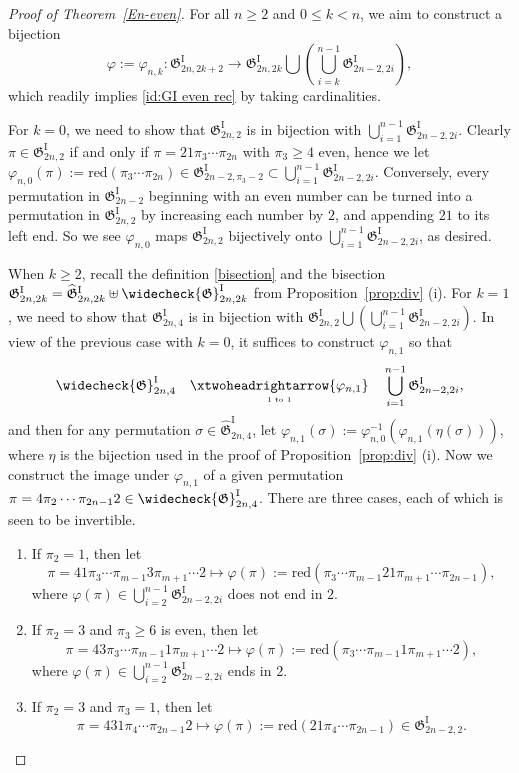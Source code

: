 \documentclass[11pt,reqno]{amsart}
\numberwithin{equation}{section}
\theoremstyle{plain}
\theoremstyle{definition}
\newcommand{\fG}{\mathfrak{G}}
\newcommand{\GI}{\fG^{\mathrm{I}}}
\newcommand{\tGI}{\widehat{\fG}^{\mathrm{I}}}
\newcommand{\cGI}{\widecheck{\fG}^{\mathrm{I}}}
\def\re{\mathrm{red}}
\begin{document}
\begin{proof}[Proof of Theorem~\ref{En-even}]
	For all $n\ge 2$ and $0\le k < n$, we aim to construct a bijection  $$\varphi:=\varphi_{n,k}: \GI_{2n,2k+2} \to \GI_{2n,2k}\bigcup\left(\bigcup_{i=k}^{n-1}\GI_{2n-2,2i}\right),$$ 
	which readily implies \eqref{id:GI even rec} by taking cardinalities.
	
	For $k=0$, we need to show that $\GI_{2n,2}$ is in bijection with $\bigcup_{i=1}^{n-1}\GI_{2n-2,2i}$. Clearly $\pi \in \GI_{2n,2}$ if and only if $\pi =21 \pi_3 \cdots \pi_{2n}$ with $\pi_3\ge 4$ even, hence we let $\varphi_{n,0}(\pi):=\re(\pi_3\cdots \pi_{2n})\in\GI_{2n-2,\pi_3-2}\subset\bigcup_{i=1}^{n-1}\GI_{2n-2,2i}$. Conversely, every permutation in $\GI_{2n-2}$ beginning with an even number can be turned into a permutation in $\GI_{2n,2}$ by increasing each number by $2$, and appending $21$ to its left end. So we see $\varphi_{n,0}$ maps $\GI_{2n,2}$ bijectively onto $\bigcup_{i=1}^{n-1}\GI_{2n-2,2i}$, as desired.
   
	When $k\ge 2$, recall the definition \eqref{bisection} and the bisection $\GI_{2n,2k}=\tGI_{2n,2k}\uplus\cGI_{2n,2k}$ from Proposition~\ref{prop:div} (i). For $k=1$, we need to show that $\GI_{2n,4}$ is in bijection with $\GI_{2n,2}\bigcup\left(\bigcup_{i=1}^{n-1}\GI_{2n-2,2i}\right)$. In view of the previous case with $k=0$, it suffices to construct $\varphi_{n,1}$ so that
	$$\cGI_{2n,4}\quad \underset{\text{\tiny 1 to 1}}{\xtwoheadrightarrow{\varphi_{n,1}}} \quad \bigcup_{i=1}^{n-1}\GI_{2n-2,2i},$$
	and then for any permutation $\sigma\in\tGI_{2n,4}$, let $\varphi_{n,1}(\sigma):=\varphi_{n,0}^{-1}(\varphi_{n,1}(\eta(\sigma)))$, where $\eta$ is the bijection used in the proof of Proposition~\ref{prop:div} (i). Now we construct the image under $\varphi_{n,1}$ of a given permutation $\pi=4\pi_2\cdots \pi_{2n-1}2 \in \cGI_{2n,4}$. There are three cases, each of which is seen to be invertible.
	\begin{enumerate}
		\item If $\pi_2=1$, then let
		$$\pi=41\pi_3\cdots \pi_{m-1}3\pi_{m+1}\cdots 2 \mapsto \varphi(\pi):=\re(\pi_3\cdots \pi_{m-1}21\pi_{m+1}\cdots \pi_{2n-1}),$$
		where $\varphi(\pi)\in \bigcup_{i=2}^{n-1} \GI_{2n-2,2i}$ does not end in $2$.
		\item If $\pi_2=3$ and $\pi_3 \geq6$ is even, then let
		$$\pi=43\pi_3\cdots \pi_{m-1}1\pi_{m+1}\cdots 2 \mapsto \varphi(\pi):=\re(\pi_3\cdots \pi_{m-1}1\pi_{m+1}\cdots 2),$$
		where $\varphi(\pi)\in \bigcup_{i=2}^{n-1} \GI_{2n-2,2i}$ ends in $2$.
		\item If $\pi_2=3$ and $\pi_3=1$, then let
		$$\pi=431\pi_4\cdots \pi_{2n-1}2 \mapsto \varphi(\pi):=\re(21\pi_4\cdots \pi_{2n-1})\in \GI_{2n-2,2}.$$
	\end{enumerate}
	

\end{proof}
\end{document}
